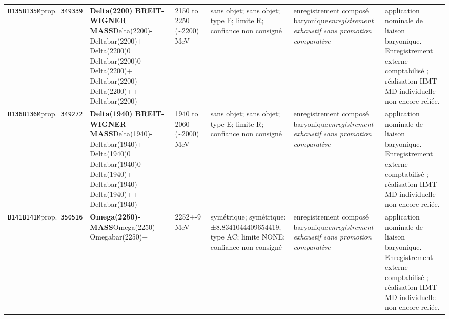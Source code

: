 \begin{landscape}
\begin{longtable}{L{1.85cm}L{4.45cm}L{2.35cm}L{4.05cm}L{3.35cm}L{7.15cm}}
\texttt{B135}\newline \texttt{B135M}\newline prop.\ \texttt{349339} & \textbf{Delta(2200) BREIT-WIGNER MASS}\newline Delta(2200)- \textbar{}\allowbreak{} Deltabar(2200)+ \textbar{}\allowbreak{} Delta(2200)0 \textbar{}\allowbreak{} Deltabar(2200)0 \textbar{}\allowbreak{} Delta(2200)+ \textbar{}\allowbreak{} Deltabar(2200)- \textbar{}\allowbreak{} Delta(2200)++ \textbar{}\allowbreak{} Deltabar(2200)-- & 2150 to 2250 (\textasciitilde{}2200)\,MeV & sans objet; sans objet; type E; limite R; confiance non consigné & enregistrement composé baryonique\newline \emph{enregistrement exhaustif sans promotion comparative} & application nominale de liaison baryonique. Enregistrement externe comptabilisé ; réalisation HMT--MD individuelle non encore reliée. \\
\texttt{B136}\newline \texttt{B136M}\newline prop.\ \texttt{349272} & \textbf{Delta(1940) BREIT-WIGNER MASS}\newline Delta(1940)- \textbar{}\allowbreak{} Deltabar(1940)+ \textbar{}\allowbreak{} Delta(1940)0 \textbar{}\allowbreak{} Deltabar(1940)0 \textbar{}\allowbreak{} Delta(1940)+ \textbar{}\allowbreak{} Deltabar(1940)- \textbar{}\allowbreak{} Delta(1940)++ \textbar{}\allowbreak{} Deltabar(1940)-- & 1940 to 2060 (\textasciitilde{}2000)\,MeV & sans objet; sans objet; type E; limite R; confiance non consigné & enregistrement composé baryonique\newline \emph{enregistrement exhaustif sans promotion comparative} & application nominale de liaison baryonique. Enregistrement externe comptabilisé ; réalisation HMT--MD individuelle non encore reliée. \\
\texttt{B141}\newline \texttt{B141M}\newline prop.\ \texttt{350516} & \textbf{Omega(2250)- MASS}\newline Omega(2250)- \textbar{}\allowbreak{} Omegabar(2250)+ & 2252+-9\,MeV & symétrique; symétrique: ±8.8341044409654419; type AC; limite NONE; confiance non consigné & enregistrement composé baryonique\newline \emph{enregistrement exhaustif sans promotion comparative} & application nominale de liaison baryonique. Enregistrement externe comptabilisé ; réalisation HMT--MD individuelle non encore reliée. \\

\end{longtable}
\end{landscape}
